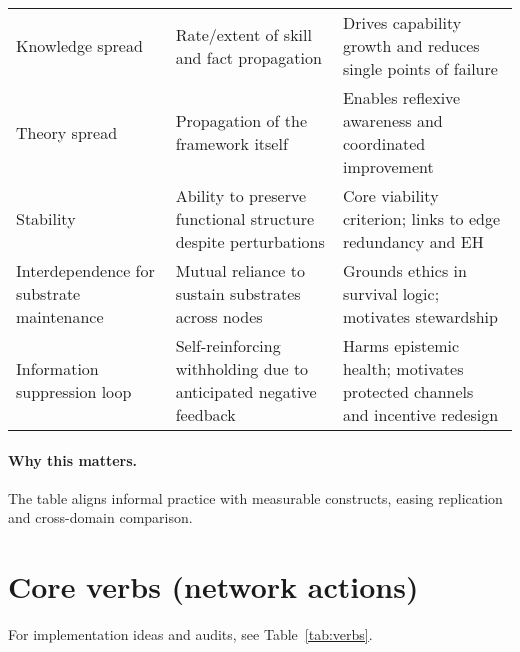 \documentclass[12pt]{article}
\begin{document}
\begin{table}[htbp]
\begin{tabularx}{\linewidth}{lYY}
Knowledge spread & Rate/extent of skill and fact propagation & Drives capability growth and reduces single points of failure \\
Theory spread & Propagation of the framework itself & Enables reflexive awareness and coordinated improvement \\
Stability & Ability to preserve functional structure despite perturbations & Core viability criterion; links to edge redundancy and EH \\
Interdependence for substrate maintenance & Mutual reliance to sustain substrates across nodes & Grounds ethics in survival logic; motivates stewardship \\
Information suppression loop & Self-reinforcing withholding due to anticipated negative feedback & Harms epistemic health; motivates protected channels and incentive redesign \\

\bottomrule
\end{tabularx}
\end{table}

\paragraph{Why this matters.} The table aligns informal practice with measurable constructs, easing replication and cross-domain comparison.
\section{Core verbs (network actions)} For implementation ideas and audits, see Table~\ref{tab:verbs}.
\end{document}
